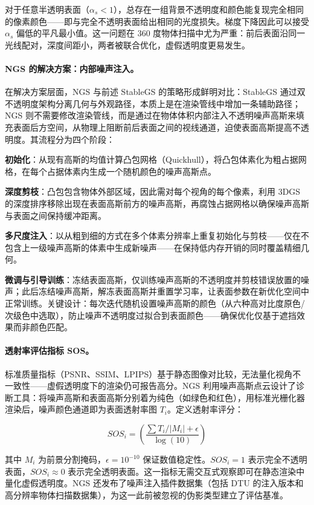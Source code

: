 对于任意半透明表面（$\alpha_s < 1$），总存在一组背景不透明度和颜色能复现完全相同的像素颜色——即与完全不透明表面给出相同的光度损失。梯度下降因此可以接受 $\alpha_s$ 偏低的平凡最小值。这一问题在 360 度物体扫描中尤为严重：前后表面沿同一光线配对，深度间距小，两者被联合优化，虚假透明度更易发生。

\paragraph{NGS 的解决方案：内部噪声注入。}在解决方案层面，NGS 与前述 StableGS 的策略形成鲜明对比：StableGS 通过双不透明度架构分离几何与外观路径，本质上是在渲染管线中增加一条辅助路径；NGS 则不需要修改渲染管线，而是通过在物体体积内部注入不透明噪声高斯来填充表面后方空间，从物理上阻断前后表面之间的视线通道，迫使表面高斯提高不透明度。其流程分为四个阶段：

\textbf{初始化}：从现有高斯的均值计算凸包网格（Quickhull），将凸包体素化为粗占据网格，在每个占据体素内生成一个随机颜色的噪声高斯点。

\textbf{深度剪枝}：凸包包含物体外部区域，因此需对每个视角的每个像素，利用 3DGS 的深度排序移除出现在表面高斯前方的噪声高斯，再腐蚀占据网格以确保噪声高斯与表面之间保持缓冲距离。

\textbf{多尺度注入}：以从粗到细的方式在多个体素分辨率上重复初始化与剪枝——仅在不包含上一级噪声高斯的体素中生成新噪声——在保持低内存开销的同时覆盖精细几何。

\textbf{微调与引导训练}：冻结表面高斯，仅训练噪声高斯的不透明度并剪枝错误放置的噪声；此后冻结噪声高斯，解冻表面高斯并重置学习率，让表面参数在新优化空间中正常训练。关键设计：每次迭代随机设置噪声高斯的颜色（从六种高对比度原色/次级色中选取），防止噪声不透明度过拟合到表面颜色——确保优化仅基于遮挡效果而非颜色匹配。

\paragraph{透射率评估指标 SOS。}标准质量指标（PSNR、SSIM、LPIPS）基于静态图像对比较，无法量化视角不一致性——虚假透明度下的渲染仍可报告高分。NGS 利用噪声高斯点云设计了诊断工具：将噪声高斯和表面高斯分别着为纯色（如绿色和红色），用标准光栅化器渲染后，噪声颜色通道即为表面透射率图 $T_i$。定义透射率评分：

\begin{equation*}
SOS_i = \left(\frac{\sum T_i / |M_i| + \epsilon}{\log(10)}\right)
\end{equation*}

其中 $M_i$ 为前景分割掩码，$\epsilon = 10^{-10}$ 保证数值稳定性。$SOS_i = 1$ 表示完全不透明表面，$SOS_i \approx 0$ 表示完全透明表面。这一指标无需交互式观察即可在静态渲染中量化虚假透明度。NGS 还发布了噪声注入插件数据集（包括 DTU 的注入版本和高分辨率物体扫描数据集），为这一此前被忽视的伪影类型建立了评估基准。

